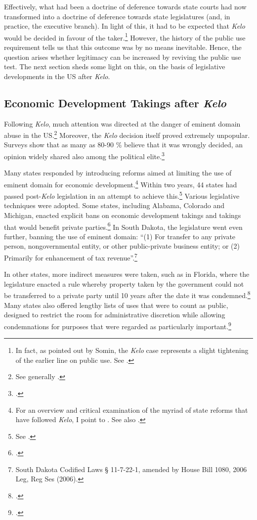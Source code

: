 Effectively, what had been a doctrine of deference towards state courts had now transformed into a doctrine of deference towards state legislatures (and, in practice, the executive branch). In light of this, it had to be expected that {\it Kelo} would be decided in favour of the taker.\footnote{In fact, as pointed out by Somin, the {\it Kelo} case represents a slight tightening of the earlier line on public use. See \cite{somin07}.} However, the history of the public use requirement tells us that this outcome was by no means inevitable. Hence, the question arises whether legitimacy can be increased by reviving the public use test. The next section sheds some light on this, on the basis of legislative developments in the US after {\it Kelo}.

\subsection{Economic Development Takings after {\it Kelo}}\label{sec:3:3:2}

Following {\it Kelo}, much attention was directed at the danger of eminent domain abuse in the US.\footnote{See generally \cite{somin09}.} Moreover, the {\it Kelo} decision itself proved extremely unpopular. Surveys show that as many as 80-90 \% believe that it was wrongly decided, an opinion widely shared also among the political elite.\footcite[2109]{somin09}

Many states responded by introducing reforms aimed at limiting the use of eminent domain for economic development.\footnote{For an overview and critical examination of the myriad of state reforms that have followed {\it Kelo}, I point to \cite{eagle08}. See also \cite{somin09}.} Within two years, 44 states had passed post-{\it Kelo} legislation in an attempt to achieve this.\footnote{See \cite{castle}.} Various legislative techniques were adopted. Some states, including Alabama, Colorado and Michigan, enacted explicit bans on economic development takings and takings that would benefit private parties.\footcite[See][107-108]{eagle08} In South Dakota, the legislature went even further, banning the use of eminent domain: ``(1) For transfer to any private person, nongovernmental entity, or other public-private business entity; or (2) Primarily for enhancement of tax revenue''.\footnote{South Dakota Codified Laws § 11-7-22-1, amended by House Bill 1080, 2006 Leg, Reg Ses (2006).}

In other states, more indirect measures were taken, such as in Florida, where the legislature enacted a rule whereby property taken by the government could not be transferred to a private party until 10 years after the date it was condemned.\footcite[809]{eagle08} Many states also offered lengthy lists of uses that were to count as public, designed to restrict the room for administrative discretion while allowing condemnations for purposes that were regarded as particularly important.\footcite[804]{eagle08}

